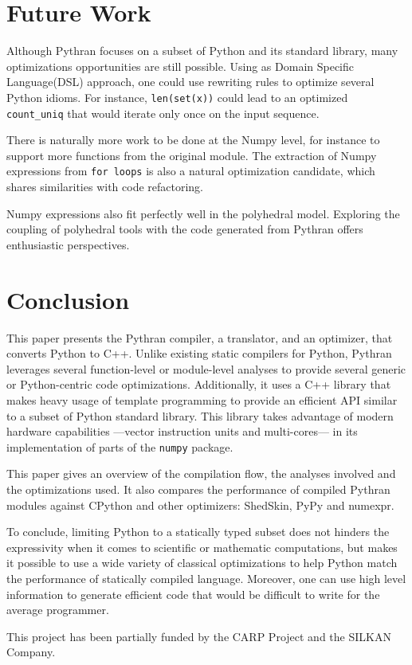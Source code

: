 \documentclass[10pt, onecolumn, preprint]{sigplanconf}
\begin{document}
\section{Future Work}

Although Pythran focuses on a subset of Python and its standard library, many
optimizations opportunities are still possible. Using as Domain Specific
Language(DSL) approach, one could use rewriting rules to optimize several
Python idioms. For instance, \texttt{len(set(x))} could lead to an optimized
\texttt{count\_uniq} that would iterate only once on the input sequence.

There is naturally more work to be done at the Numpy level, for instance to
support more functions from the original module. The extraction of Numpy
expressions from \texttt{for loops} is also a natural optimization candidate, which
shares similarities with code refactoring.

Numpy expressions also fit perfectly well in the polyhedral model. Exploring
the coupling of polyhedral tools with the code generated from Pythran offers
enthusiastic perspectives.

\section{Conclusion}

This paper presents the Pythran compiler, a translator, and an optimizer, that
converts Python to C++. Unlike existing static compilers for Python, Pythran
leverages several function-level or module-level analyses to provide several
generic or Python-centric code optimizations. Additionally, it uses a C++
library that makes heavy usage of template programming to provide an efficient
API similar to a subset of Python standard library. This library takes
advantage of modern hardware capabilities ---vector instruction units and
multi-cores--- in its implementation of parts of the \texttt{numpy} package.

This paper gives an overview of the compilation flow, the analyses involved and
the optimizations used. It also compares the performance of compiled Pythran
modules against CPython and other optimizers: ShedSkin, PyPy and numexpr.

To conclude, limiting Python to a statically typed subset does not hinders the
expressivity when it comes to scientific or mathematic computations, but makes
it possible to use a wide variety of classical optimizations to help Python
match the performance of statically compiled language. Moreover, one can use
high level information to generate efficient code that would be difficult to write for the average programmer.

\acks

This project has been partially funded by the CARP Project and the SILKAN
Company.




\end{document}
